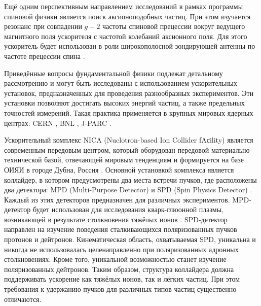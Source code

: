 \par	Ещё одним перспективным направлением исследований в рамках программы спиновой физики является поиск аксионоподобных частиц. При этом изучается резонанс при совпадении $g-2$ частоты спиновой прецессии вокруг ведущего магнитного поля ускорителя с частотой колебаний аксионного поля. Для этого ускоритель будет использован в роли широкополосной зондирующей антенны по частоте прецессии спина \autocite{Axion_Nikolaev}.

\par	Приведённые вопросы фундаментальной физики подлежат детальному рассмотрению и могут быть исследованы с использованием ускорительных установок, предназначенных для проведения разнообразных экспериментов. Эти установки позволяют достигать высоких энергий частиц, а также предельных точностей измерений. Такая практика применяется в крупных мировых ядерных центрах: CERN \autocite{lhc:heavy_ions}, BNL \autocite{rhic:design}, J-PARC \autocite{j-park}. 

\par	Ускорительный комплекс NICA (Nuclotron-based Ion Collider fAсility) является современным передовым центром, который оборудован передовой материально-технической базой, отвечающей мировым тенденциям и формируется на базе ОИЯИ в городе Дубна, Россия \autocite{nuclotron24}. Основной установкой комплекса является коллайдер, в котором предусмотрены два места встречи пучков, где расположены два детектора: MPD (Multi-Purpose Detector) и SPD (Spin Physics Detector) \autocite{Ladygin:SPD}. Каждый из этих детекторов предназначен для различных экспериментов. MPD-детектор будет использован для исследования кварк-глюонной плазмы, возникающей в результате столкновения тяжёлых ионов \autocite{Tech, MPD}. SPD-детектор направлен на изучение поведения сталкивающихся поляризованных пучков протонов и дейтронов. Кинематическая область, охватываемая SPD, уникальна и никогда не использовалась целенаправленно при поляризованных адронных столкновениях. Кроме того, уникальной возможностью станет изучение поляризованных дейтронов. Таким образом, структура коллайдера должна поддерживать ускорение как тяжёлых ионов, так и лёгких частиц. При этом требования к удержанию пучков для различных типов частиц существенно отличаются.

